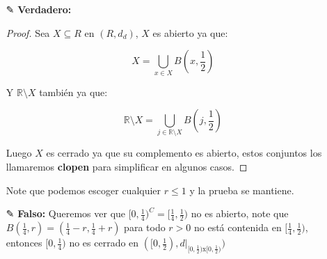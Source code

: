 \begin{itemize}[leftmargin=*]
\begin{basedtikz}

\end{basedtikz}

\begin{proof}
    Para ver que los naturales son cerrados con $d_1$, veamos que su complemento es abierto. Observe que:


    $$\displaystyle \mathbb{R}\setminus\mathbb{N}=(-\infty,0)\bigcup_{i \in \mathbb{N}}B\left(i+\frac{1}{2},\frac{1}{2}\right)$$


Note que esas bolas son abiertas y unión arbitraria de abiertos es abierto, efectivamente esas bolas cubren $\mathbb{R}\setminus \mathbb{N}$ entonces acabamos.
    
\end{proof}


\item[✎]\textbf{Verdadero: } \\
\begin{proof}
    Sea $X\subseteq R$ en $(R,d_d)$, $X$ es abierto ya que:

    $$X=\bigcup_{x \in X}B\left(x,\frac{1}{2}\right)$$

    Y $\mathbb{R}\setminus X$ también ya que:

     $$\mathbb{R}\setminus X=\bigcup_{j \in \mathbb{R}\setminus X}B\left(j,\frac{1}{2}\right)$$

     Luego $X$ es cerrado ya que su complemento es abierto, estos conjuntos los llamaremos \textbf{clopen} para simplificar en algunos casos.
\end{proof}

Note que podemos escoger cualquier $r\leq 1$ y la prueba se mantiene.

\item[✎] \textbf{Falso: }Queremos ver que $[0,\frac{1}{4})^C=[\frac{1}{4},\frac{1}{2})$ no es abierto, note que $B(\frac{1}{4},r)=(\frac{1}{4}-r,\frac{1}{4}+r)$ para todo $r>0$ no está contenida en $[\frac{1}{4},\frac{1}{2})$, entonces $[0,\frac{1}{4})$ no es cerrado en $([0,\frac{1}{2}),d|_{[0,\frac{1}{2})\text{x}[0,\frac{1}{2})})$ 


\end{itemize}
